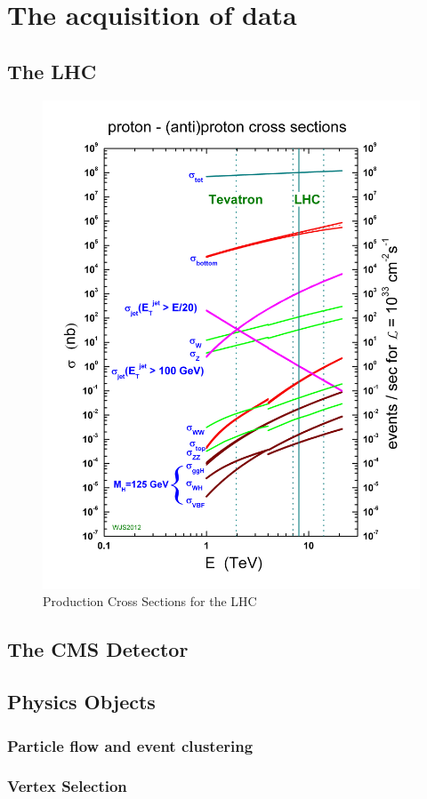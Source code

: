 \chapter{The acquisition of data}

\section{The LHC}

\begin{figure}[h!]
  \centering
  \includegraphics[width=.7\textwidth]{figures/lhc_decay_modes.jpg}
  \caption{Production Cross Sections for the LHC}
  \label{fig:lhc_decay_modes}
\end{figure}

\section{The CMS Detector}

\section{Physics Objects}
\subsection{Particle flow and event clustering}
\subsection{Vertex Selection}
